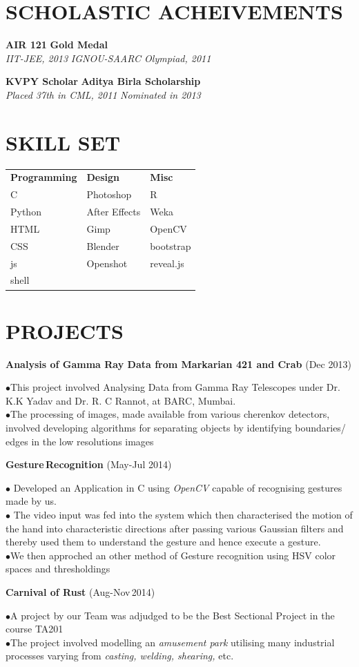 \documentclass{article}
\newcommand{\sepspace}{\vspace*{0.8em}}
\newcommand{\NewPart}[1]{\section*{\uppercase{#1}}}
\newcommand{\SkillsEntry}[3]{#1 & #2 & #3\\}
\newcommand{\ScholasticAcheivements}[4]{
		\noindent \textbf{#1} \hfill \textbf{#2} \\
		\textit{#3}	 \hfill	 \textit{ #4} 	
		\normalsize \par
		}
\newcommand{\WorkEntry}[3]{						
		\noindent \textbf{#1} \hfill 					
		(#2) \par		
		\noindent #3 \par					
		}
\begin{document}
\NewPart{Scholastic Acheivements}{}

\ScholasticAcheivements{AIR 121}{Gold Medal}{IIT-JEE, 2013}{IGNOU-SAARC Olympiad, 2011}

\sepspace

\ScholasticAcheivements{KVPY Scholar}{Aditya Birla Scholarship}{Placed 37th in CML, 2011}{Nominated in 2013}
\NewPart{Skill Set}
	\begin{tabular}{m{}  m{} m{}}
		\SkillsEntry{\textbf{Programming}}{\textbf{Design}}{\textbf{Misc}}
		\SkillsEntry{C}{Photoshop}{R}
		\SkillsEntry{Python}{After Effects}{Weka}
		\SkillsEntry{HTML}{Gimp}{OpenCV}
		\SkillsEntry{CSS}{Blender}{bootstrap}
		\SkillsEntry{js}{Openshot}{reveal.js}
		\SkillsEntry{shell}{}{}
	\end{tabular}
\NewPart{Projects}
\WorkEntry{Analysis of Gamma Ray Data from Markarian 421 and Crab}{Dec 2013}{$\bullet$This project involved Analysing Data from Gamma Ray Telescopes under Dr. K.K Yadav and Dr. R. C Rannot, at BARC, Mumbai.\\$\bullet$The processing of images, made available from various cherenkov detectors, involved developing algorithms for separating objects by identifying boundaries/ edges in the low resolutions images}
\pagebreak
\WorkEntry{Gesture\,Recognition}{May-Jul 2014}{$\bullet$ Developed an Application in C using \emph{OpenCV} capable of recognising gestures made by us.\\ $\bullet$ The video input was fed into the system which then characterised the motion of the hand into characteristic
directions after passing various Gaussian filters and thereby used them to understand the gesture and
hence execute a gesture.\\$\bullet$We then approched an other method of Gesture recognition using HSV color spaces and thresholdings}
\sepspace
\WorkEntry{Carnival of Rust}{Aug-Nov\,2014}{$\bullet$A project by our Team was adjudged to be the Best Sectional Project in the course TA201\\$\bullet$The project involved modelling an \emph{amusement park} utilising many industrial processes varying from \emph{casting, welding, shearing,} etc.}
\end{document}
